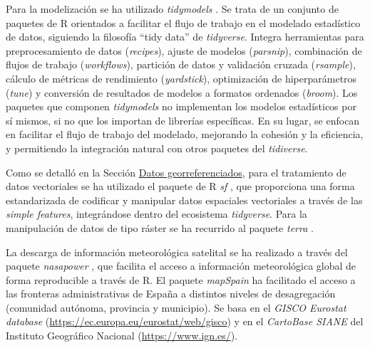 \documentclass[12pt,a4paper,]{book}
\numberwithin{dummy}{section}
\theoremstyle{ocrenumbox}
\theoremstyle{blacknumex}
\theoremstyle{blacknumbox}
\theoremstyle{ocrenum}
\theoremstyle{ocrenum}
\begin{document}
Para la modelización se ha utilizado \emph{tidymodels}
\citep{tidymodelspackage}. Se trata de un conjunto de paquetes de R
orientados a facilitar el flujo de trabajo en el modelado estadístico de
datos, siguiendo la filosofía ``tidy data'' de \emph{tidyverse}. Integra
herramientas para preprocesamiento de datos (\emph{recipes}), ajuste de
modelos (\emph{parsnip}), combinación de flujos de trabajo
(\emph{workflows}), partición de datos y validación cruzada
(\emph{rsample}), cálculo de métricas de rendimiento (\emph{yardstick}),
optimización de hiperparámetros (\emph{tune}) y conversión de resultados
de modelos a formatos ordenados (\emph{broom}). Los paquetes que
componen \emph{tidymodels} no implementan los modelos estadísticos por
sí mismos, si no que los importan de librerías específicas. En su lugar,
se enfocan en facilitar el flujo de trabajo del modelado, mejorando la
cohesión y la eficiencia, y permitiendo la integración natural con otros
paquetes del \emph{tidiverse}.

Como se detalló en la Sección
\protect\hyperlink{datos-georreferenciados}{Datos georreferenciados},
para el tratamiento de datos vectoriales se ha utilizado el paquete de R
\emph{sf} \citep{sfpackage}, que proporciona una forma estandarizada de
codificar y manipular datos espaciales vectoriales a través de las
\emph{simple features}, integrándose dentro del ecosistema
\emph{tidyverse}. Para la manipulación de datos de tipo ráster se ha
recurrido al paquete \emph{terra} \citep{terrapackage}.

La descarga de información meteorológica satelital se ha realizado a
través del paquete \emph{nasapower} \citep{nasapower}, que facilita el
acceso a información meteorológica global de forma reproducible a través
de R. El paquete \emph{mapSpain}\citep{R-mapspain} ha facilitado el
acceso a las fronteras administrativas de España a distintos niveles de
desagregación (comunidad autónoma, provincia y municipio). Se basa en el
\emph{GISCO Eurostat database}
(\url{https://ec.europa.eu/eurostat/web/gisco}) y en el \emph{CartoBase
SIANE} del Instituto Geográfico Nacional (\url{https://www.ign.es/}).




%
\end{document}
